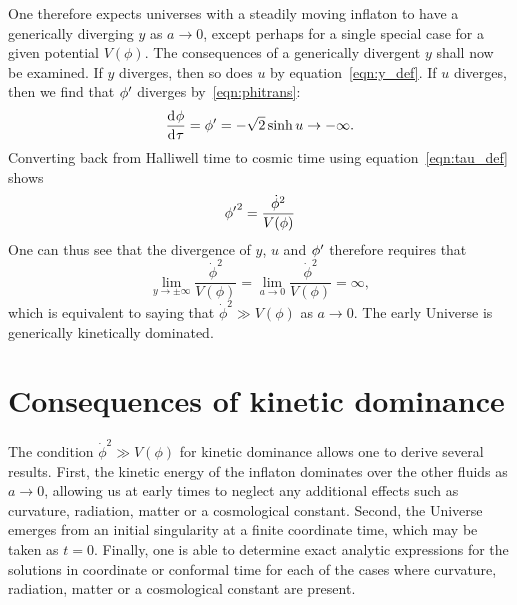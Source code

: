 One therefore expects universes with a steadily moving inflaton to have a generically diverging $y$ as $a\to0$, except perhaps for a single special case for a given potential $V(\phi)$.  The consequences of a generically divergent $y$ shall now be examined.  If $y$ diverges, then so does $u$ by equation~\eqref{eqn:y_def}. If $u$ diverges, then we find that ${{\phi}^\prime}$ diverges by~\eqref{eqn:phitrans}:
%
\begin{equation}
  \frac{\operatorname{d}^{}\!{\phi}}{\operatorname{d}^{}\!{\tau}}={{\phi}^\prime} 
  = 
  -\sqrt{2}\sinh u\rightarrow -\infty.
\end{equation}
%
Converting back from Halliwell time to cosmic time using equation~\eqref{eqn:tau_def} shows
%
\begin{equation}
  {{\phi}^\prime}^2 
  = 
  \frac{\dot{\phi}^2}{V(\phi)}
\end{equation}
%
One can thus see that the divergence of $y$, $u$ and ${{\phi}^\prime}$ therefore requires that
%
\begin{equation}
  \lim\limits_{y\to\pm\infty} \frac{\dot\phi^2}{V(\phi)}
  =
  \lim\limits_{a\to 0} \frac{\dot\phi^2}{V(\phi)} = \infty,
  \label{eqn:kdfinal}
\end{equation}
%
which is equivalent to saying that $\dot{\phi}^2\gg V(\phi)$ as
$a\to0$. The early Universe is generically kinetically dominated.

\section{Consequences of kinetic dominance}
\label{sec:consequences_of_kinetic_dominance}

The condition $\dot\phi^2\gg V(\phi)$ for kinetic dominance allows one to derive several results. First, the kinetic energy of the inflaton dominates over the other fluids as $a\to 0$, allowing us at early times to neglect any additional effects such as curvature, radiation, matter or a cosmological constant. Second, the Universe emerges from an initial singularity at a finite coordinate time, which may be taken as $t=0$. Finally, one is able to determine exact analytic expressions for the solutions in coordinate or conformal time for each of the cases where curvature, radiation, matter or a cosmological constant are present.


